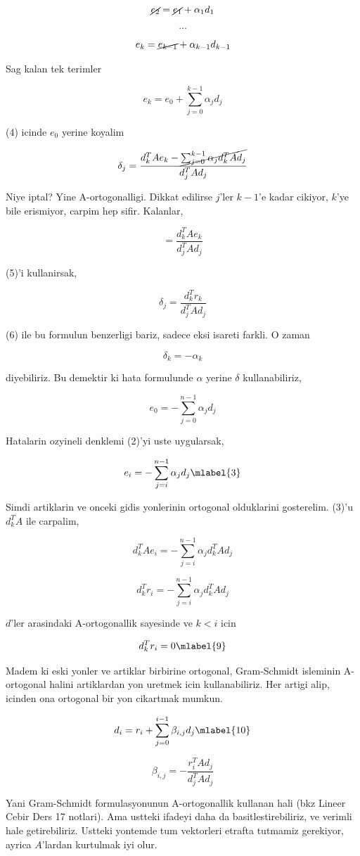 \documentclass[12pt,fleqn]{article}\usepackage{../common}
\begin{document}
\[ \cancel{e_{2}} = \cancel{e_1} + \alpha_1 d_1\]

\[ ... \]

\[ e_{k} = \cancel{e_{k-1}} + \alpha_{k-1} d_{k-1}\]


Sag kalan tek terimler 

\[ e_k = e_0 + \sum _{ j=0}^{k-1} \alpha_j d_j \]

(4) icinde $e_0$ yerine koyalim

\[ \delta_j = \frac{ d_k^T A e_k - \cancel{\sum _{ j=0}^{k-1} \alpha_j d_k^T A d_j}}
{ d_j^T A d_j } 
\]

Niye iptal? Yine A-ortogonalligi. Dikkat edilirse $j$'ler $k-1$'e kadar
cikiyor, $k$'ye bile erismiyor, carpim hep sifir. Kalanlar,

\[  = \frac{ d_k^T A e_k}
{ d_j^T A d_j } 
\]

(5)'i kullanirsak, 

\[ \delta_j = \frac{ d_k^T r_k}
{ d_j^T A d_j } 
\]


(6) ile bu formulun benzerligi bariz, sadece eksi isareti farkli. O zaman 

\[ \delta_k = -\alpha_k \]

diyebiliriz. Bu demektir ki hata formulunde $\alpha$ yerine $\delta$
kullanabiliriz, 

\[ e_0 = -\sum _{ j=0}^{n-1} \alpha_j d_j \]

Hatalarin ozyineli denklemi (2)'yi uste uygularsak, 

\[ e_i = -\sum _{ j=i}^{n-1} \alpha_j d_j 
\mlabel{3}
\]

Simdi artiklarin ve onceki gidis yonlerinin ortogonal olduklarini
gosterelim. (3)'u $d_k^TA$ ile carpalim, 

\[ d_k^TAe_i = -\sum _{ j=i}^{n-1} \alpha_j  d_k^TAd_j 
\]

\[ d_k^Tr_i = -\sum _{ j=i}^{n-1} \alpha_j  d_k^TAd_j 
\]

$d$'ler arasindaki A-ortogonallik sayesinde ve $k < i$ icin 

\[ d_k^Tr_i = 0
\mlabel{9}
\]

Madem ki eski yonler ve artiklar birbirine ortogonal, Gram-Schmidt
isleminin A-ortogonal halini artiklardan yon uretmek icin
kullanabiliriz. Her artigi alip, icinden ona ortogonal bir yon cikartmak
mumkun.

\[ d_i = r_i + \sum _{ j=0}^{i-1} \beta_{i,j}d_j 
\mlabel{10}
\]

\[ \beta_{i,j} = - \frac{ r_i^TAd_j}{d_j^TAd_j} \]

Yani Gram-Schmidt formulasyonunun A-ortogonallik kullanan hali (bkz Lineer
Cebir Ders 17 notlari). Ama ustteki ifadeyi daha da basitlestirebiliriz, ve
verimli hale getirebiliriz. Ustteki yontemde tum vektorleri etrafta
tutmamiz gerekiyor, ayrica $A$'lardan kurtulmak iyi olur. 
\end{document}
